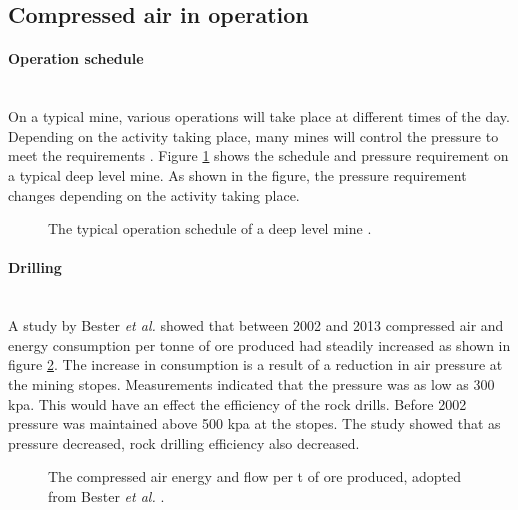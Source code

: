 \subsection{Compressed air in operation}
	\paragraph{Operation schedule}\leavevmode\\
	On a typical mine, various operations will take place at different times of the day. Depending on the activity taking place, many mines will control the pressure to meet the requirements \cite{Kriel2014Masters,Marais2012PhD}. Figure \ref{fig: Mining schedule} shows the schedule and pressure requirement on a typical deep level mine. As shown in the figure, the pressure requirement changes depending on the activity taking place.
		\begin{figure}[h]
		\centering
		\fbox{}
		\caption[A typical operation schedule of a deep level mine.]{The typical operation schedule of a deep level mine \cite{Kriel2014Masters}.}
		\label{fig: Mining schedule}
	\end{figure}
	\paragraph*{Drilling}\leavevmode\\
	A study by  Bester \textit{et al.} showed that between 2002 and 2013 compressed air and energy consumption per tonne of ore produced had steadily increased as shown in figure \ref{fig: Compressed energy and air flow per ton}. The increase in consumption is a result of a reduction in air pressure at the mining stopes. Measurements indicated that the pressure was as low as 300 \gls{kpa}. This would have an effect the efficiency of the rock drills. Before 2002 pressure was maintained above 500 \gls{kpa} at the stopes.  The study showed that as pressure decreased, rock drilling efficiency also decreased.\cite{bester2013effect} \par
	
	\begin{figure}[h]
		\centering
		\fbox{}
		\caption[The compressed air energy and flow per tonne of ore produced.]{The compressed air energy and flow per \gls{t} of ore produced, adopted from Bester \textit{et al.} \cite{bester2013effect}.}
		\label{fig: Compressed energy and air flow per ton}
	\end{figure}

